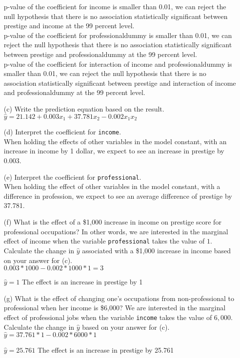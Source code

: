 \documentclass[12pt,letterpaper]{article}
\begin{document}
\begin{enumerate}
	p-value of the coefficient for income is smaller than 0.01, we can reject the null hypothesis that there is no association statistically significant between prestige and income at the 99 percent level.\\
	p-value of the coefficient for professionaldummy is smaller than 0.01, we can reject the null hypothesis that there is no association statistically significant between prestige and professionaldummy at the 99 percent level.\\
	p-value of the coefficient for interaction of income and professionaldummy is smaller than 0.01, we can reject the null hypothesis that there is no association statistically significant between prestige and interaction of income and professionaldummy at the 99 percent level.
	
	\vspace{6cm}
	\item [(c)]
	Write the prediction equation based on the result.\\
	 $  \hat{y} = 21.142 +  0.003x_{1} + 37.781x_{2} -0.002x_{1}x_{2}  $		
	
\newpage
	\item [(d)]
	Interpret the coefficient for \texttt{income}.\\
	When holding the effects of other variables in the model constant, with an increase in income by 1 dollar, we expect to see an increase in prestige by 0.003.  
	
	\vspace{10cm}	
	\item [(e)]
	Interpret the coefficient for \texttt{professional}.\\
	When holding the effect of other variables in the model constant, with a difference in profession, we expect to see an average difference of prestige by 37.781.  
	
	\newpage
	\item [(f)]
	What is the effect of a \$1,000 increase in income on prestige score for professional occupations? In other words, we are interested in the marginal effect of income when the variable \texttt{professional} takes the value of $1$. Calculate the change in $\hat{y}$ associated with a \$1,000 increase in income based on your answer for (c).\\
	$ 0.003 * 1000 - 0.002*1000*1 = 3 $
	
	$\hat{y} = 1 $
	The effect is an increase in prestige by 1
	\vspace{10cm}
	
	
	\item [(g)]
	What is the effect of changing one's occupations from non-professional to professional when her income is \$6,000? We are interested in the marginal effect of professional jobs when the variable \texttt{income} takes the value of $6,000$. Calculate the change in $\hat{y}$ based on your answer for (c).\\
		$\hat{y} = 37.761 * 1 - 0.002 * 6000 *1 $
	
	$\hat{y} =  25.761 $
	The effect is an increase in prestige by 25.761
	
	
\end{enumerate}
\end{document}

